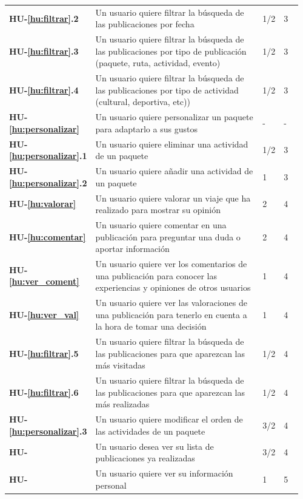 \documentclass[11pt]{article}
\newcounter{HUCounter}
\newcommand{\hu}[1]{\refstepcounter{HUCounter}\textbf{\rmfamily HU-\theHUCounter}\label{#1}}
\begin{document}
\begin{longtable}{p{0.12\linewidth}p{0.7\linewidth}p{0.07\linewidth}p{0.07\linewidth}}
  \rowcolor{dollarbill}
  \textbf{HU-\ref{hu:filtrar}.2} & Un usuario quiere filtrar la búsqueda de las publicaciones por fecha & 1/2 & 3\\ 
  \rowcolor{dollarbill}
  \textbf{HU-\ref{hu:filtrar}.3} & Un usuario quiere filtrar la búsqueda de las publicaciones por tipo de publicación (paquete, ruta, actividad, evento) & 1/2 & 3\\ 
  \rowcolor{dollarbill}
  \textbf{HU-\ref{hu:filtrar}.4} & Un usuario quiere filtrar la búsqueda de las publicaciones por tipo de actividad (cultural, deportiva, etc)) & 1/2 & 3\\
    \textbf{HU-\ref{hu:personalizar}} & Un usuario quiere personalizar un paquete para adaptarlo a sus gustos & - & - \\ 
  \rowcolor{dollarbill}
  \textbf{HU-\ref{hu:personalizar}.1} & Un usuario quiere eliminar una actividad de un paquete & 1/2 & 3 \\ 
  \textbf{HU-\ref{hu:personalizar}.2} & Un usuario quiere añadir una actividad de un paquete & 1 & 3 \\
  \textbf{HU-\ref{hu:valorar}} & Un usuario quiere valorar un viaje que ha realizado para mostrar su opinión & 2 & 4\\
  \textbf{HU-\ref{hu:comentar}} & Un usuario quiere comentar en una publicación para preguntar una duda o aportar información & 2 & 4\\ 
  \textbf{HU-\ref{hu:ver_coment}} & Un usuario quiere ver los comentarios de una publicación para conocer las experiencias y opiniones de otros usuarios & 1 & 4\\ 
  \textbf{HU-\ref{hu:ver_val}} & Un usuario quiere ver las valoraciones de una publicación para tenerlo en cuenta a la hora de tomar una decisión & 1 & 4\\ 
  \textbf{HU-\ref{hu:filtrar}.5} & Un usuario quiere filtrar la búsqueda de las publicaciones para que aparezcan las más visitadas & 1/2 & 4\\ 
  \textbf{HU-\ref{hu:filtrar}.6} & Un usuario quiere filtrar la búsqueda de las publicaciones para que aparezcan las más realizadas & 1/2 & 4\\
  \textbf{HU-\ref{hu:personalizar}.3} & Un usuario quiere modificar el orden de las actividades de un paquete & 3/2 & 4 \\
  \hu{hu:ver_realizadas} & Un usuario desea ver su lista de publicaciones ya realizadas & 3/2 & 4\\
  \hu{hu:ver_datos} & Un usuario quiere ver su información personal & 1 & 5 \\

\end{longtable}
\end{document}
